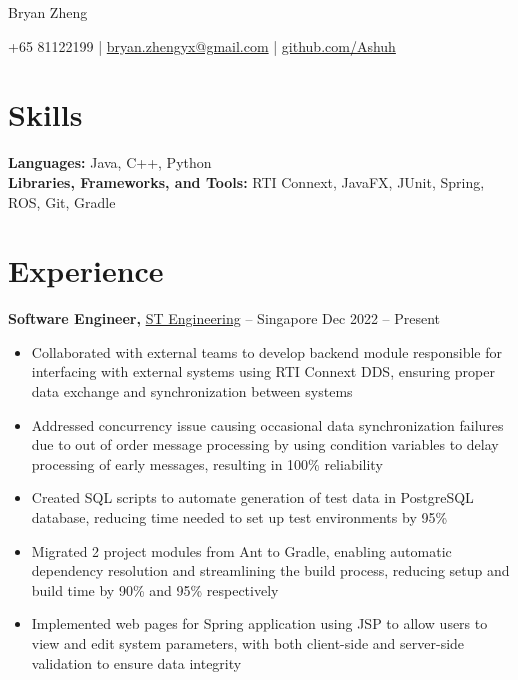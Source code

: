 \documentclass[11pt]{article}       %
\begin{document}
\centerline{\Huge Bryan Zheng}

\vspace{5pt}

\centerline{+65 81122199 | \href{mailto:bryan.zhengyx@gmail.com}{bryan.zhengyx@gmail.com} | \href{https://github.com/Ashuh}{github.com/Ashuh}}

\vspace{-10pt}

\section*{Skills}
\textbf{Languages:} Java, C++, Python \\
\textbf{Libraries, Frameworks, and Tools:} RTI Connext, JavaFX, JUnit, Spring, ROS, Git, Gradle

\vspace{-6.5pt}

\section*{Experience}
\textbf{Software Engineer,} \href{https://www.stengg.com/}{ST Engineering} -- Singapore \hfill Dec 2022 -- Present \\
\vspace{-9pt}
\begin{itemize}
  \item Collaborated with external teams to develop backend module responsible for interfacing with external systems using RTI Connext DDS, ensuring proper data exchange and synchronization between systems
  \item Addressed concurrency issue causing occasional data synchronization failures due to out of order message processing by using condition variables to delay processing of early messages, resulting in 100\% reliability
  \item Created SQL scripts to automate generation of test data in PostgreSQL database, reducing time needed to set up test environments by 95\%
  \item Migrated 2 project modules from Ant to Gradle, enabling automatic dependency resolution and streamlining the build process, reducing setup and build time by 90\% and 95\% respectively
  \item Implemented web pages for Spring application using JSP to allow users to view and edit system parameters, with both client-side and server-side validation to ensure data integrity
\end{itemize}
\end{document}
